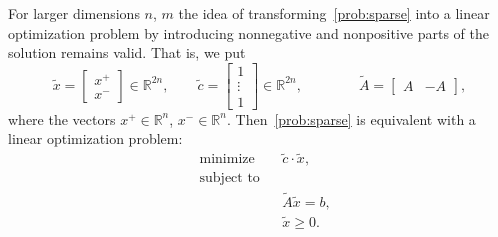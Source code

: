 \documentclass[10pt,a4paper]{article}
\theoremstyle{plain}
\theoremstyle{definition}
\begin{document}
For larger dimensions  \(n\), \(m\) the idea of transforming~\eqref{prob:sparse} into a linear optimization problem by introducing nonnegative and nonpositive parts of the solution remains valid.
That is, we put
\[
\tilde{x} = \begin{bmatrix}x^+\\x^-\end{bmatrix}\in\mathbb{R}^{2n},\qquad
\tilde{c} = \begin{bmatrix}1\\\vdots\\1\end{bmatrix}\in\mathbb{R}^{2n},\qquad
\qquad
\tilde{A} = \begin{bmatrix}
A & -A
\end{bmatrix},
\]
where the vectors \(x^+\in \mathbb{R}^n\), \(x^-\in \mathbb{R}^n\).
Then~\eqref{prob:sparse} is equivalent with a linear optimization problem:
\begin{equation}\label{prob:LP2}\begin{aligned}
&\text{minimize} && \tilde{c}\cdot \tilde{x},\\
&\text{subject to}&&\\
&&&\tilde{A}\tilde{x}= b,\\
&&& \tilde{x}\geq 0.
\end{aligned}\end{equation}
\end{document}
